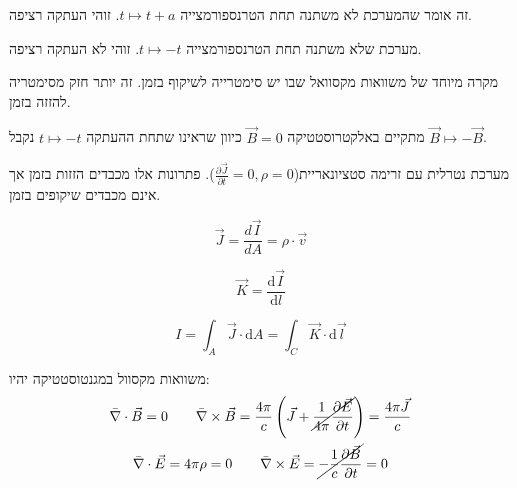 \documentclass{tstextbook}
\begin{document}
\begin{definition}
זה אומר שהמערכת לא משתנה תחת הטרנספורמצייה \(t\mapsto t+a\). זוהי העתקה רציפה.

\end{definition}
\begin{definition}
מערכת שלא משתנה תחת הטרנספורמצייה \(t\mapsto -t\). זוהי לא העתקה רציפה.

\end{definition}
\begin{definition}[אלקטרוסטטיקה]
מקרה מיוחד של משוואות מקסוואל שבו יש סימטרייה לשיקוף בזמן. זה יותר חזק מסימטריה להזזה בזמן.

\end{definition}
\begin{corollary}
מתקיים באלקטרוסטטיקה \(\vec{B} = 0\) כיוון שראינו שתחת ההעתקה \(t\mapsto -t\) נקבל \(\vec{B}\mapsto-\vec{B}\).

\end{corollary}
\begin{definition}[מגנטוסטטיקה]
מערכת נטרלית עם זרימה סטציונאריית(\(\frac{\partial \vec{J}}{\partial t}=0,\rho=0\)). פתרונות אלו מכבדים הזזות בזמן אך אינם מכבדים שיקופים בזמן.

\end{definition}
\begin{definition}
$$\vec{J} = \frac{d\vec{I}}{dA}=\rho\cdot \vec{v}$$

\end{definition}
\begin{definition}
$$\vec{K}=\frac{\mathrm{d} \vec{I}}{\mathrm{d} l} $$

\end{definition}
\begin{definition}[זרם]
$$I=\int_{A}\vec{J}\cdot \mathrm{d}A=\int_{C}\vec{K}\cdot \mathrm{d}\vec{l}$$

\end{definition}
\begin{proposition}
משוואות מקסוול במגנטוסטטיקה יהיו:
\begin{gather*}\bar{\nabla} \cdot \vec{B}=0 \qquad \bar{\nabla} \times  \vec{B} = \frac{4\pi}{c}\left( \vec{J}+\cancel{ \frac{1}{4\pi}\frac{\partial \vec{E}}{\partial t} }  \right)=\frac{4\pi \vec{J}}{c}\\\bar{\nabla} \cdot \vec{E} = 4\pi \rho = 0 \qquad 
\bar{\nabla} \times \vec{E} =  \cancel{ -\frac{1}{c}\frac{\partial \vec{B}}{\partial t} } =0 \end{gather*}

\end{proposition}
\end{document}
